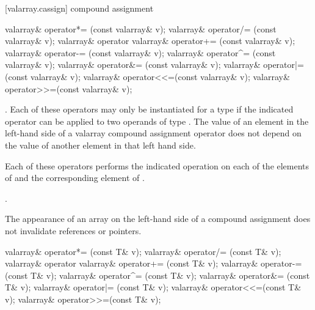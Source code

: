 [valarray.cassign]{ compound assignment}

%
%
%
%
%
%
%
%
%
%
\begin{itemdecl}
valarray& operator*= (const valarray& v);
valarray& operator/= (const valarray& v);
valarray& operator%
valarray& operator+= (const valarray& v);
valarray& operator-= (const valarray& v);
valarray& operator^= (const valarray& v);
valarray& operator&= (const valarray& v);
valarray& operator|= (const valarray& v);
valarray& operator<<=(const valarray& v);
valarray& operator>>=(const valarray& v);
\end{itemdecl}

\begin{itemdescr}
\pnum
\requires
{}.
Each of these operators may only be instantiated for a type 
if the indicated operator can be applied to two operands of type .
The value of an element in the left-hand side of a valarray compound
assignment operator does not depend on the value of another element in that left
hand side.

\pnum
\effects
Each of these operators
performs the indicated operation on each of the elements of  and the
corresponding element of .

\pnum
\returns
{}.

\pnum
\remarks
The appearance of an array on the left-hand side of a compound assignment
does not invalidate references or pointers.
\end{itemdescr}

%
%
%
%
%
%
%
%
%
%
\begin{itemdecl}
valarray& operator*= (const T& v);
valarray& operator/= (const T& v);
valarray& operator%
valarray& operator+= (const T& v);
valarray& operator-= (const T& v);
valarray& operator^= (const T& v);
valarray& operator&= (const T& v);
valarray& operator|= (const T& v);
valarray& operator<<=(const T& v);
valarray& operator>>=(const T& v);
\end{itemdecl}


